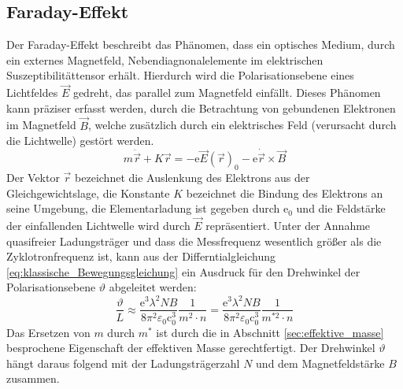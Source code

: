 \subsection{Faraday-Effekt}
Der Faraday-Effekt beschreibt das Phänomen, dass ein optisches
Medium, durch ein externes Magnetfeld, Nebendiagnonalelemente im elektrischen Suszeptibilitättensor erhält.
Hierdurch wird die Polarisationsebene eines Lichtfeldes $\vec{E}$ gedreht, das parallel zum Magnetfeld einfällt.
Dieses Phänomen kann präziser erfasst werden, durch die Betrachtung von gebundenen Elektronen im Magnetfeld $\vec{B}$, welche zusätzlich durch ein elektrisches Feld (verursacht durch die Lichtwelle) gestört werden.
\begin{equation}
  \label{eq:klassische_Bewegungsgleichung}
  m\ddot{\vec{r}}+K\vec{r}=-\text{e}\vec{E}(\vec{r})_0-\text{e}\dot{\vec{r}}\times\vec{B}
\end{equation}
Der Vektor $\vec{r}$ bezeichnet die Auslenkung des Elektrons aus der Gleichgewichtslage, die Konstante $K$ bezeichnet die Bindung des Elektrons an seine Umgebung, die Elementarladung
ist gegeben durch $\text{e}_0$ und die Feldstärke der einfallenden Lichtwelle
wird durch $\vec{E}$ repräsentiert.
Unter der Annahme quasifreier Ladungsträger und dass die Messfrequenz wesentlich größer als die Zyklotronfrequenz ist, kann
aus der Differntialgleichung \eqref{eq:klassische_Bewegungsgleichung} ein Ausdruck
für den Drehwinkel der Polarisationsebene $\vartheta$ abgeleitet werden:
\begin{equation}
  \label{eq:drehwinkel}
  \frac{\vartheta}{L}\approx \frac{\text{e}^3\lambda^2 NB}{8\pi^2\varepsilon_0\text{c}_0^3}\frac{1}{m^2 \cdot n} = \frac{\text{e}^3\lambda^2 NB}{8\pi^2\varepsilon_0\text{c}_0^3}\frac{1}{m^{*2} \cdot n}
\end{equation}
Das Ersetzen von $m$ durch $m^*$ ist durch die in Abschnitt \ref{sec:effektive_masse}
besprochene Eigenschaft der effektiven Masse gerechtfertigt.
Der Drehwinkel $\vartheta$ hängt daraus folgend mit der Ladungsträgerzahl $N$ und dem Magnetfeldstärke $B$ zusammen.
